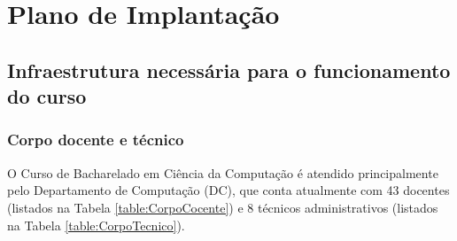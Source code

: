 
\chapter {Plano de Implantação}\label{sec:implantacao}

\section {Infraestrutura necessária para o funcionamento do curso}

\subsection{Corpo docente e técnico}

O Curso de Bacharelado em Ciência da Computação é atendido principalmente pelo Departamento de Computação (DC), que conta atualmente com 43 docentes (listados na Tabela \ref{table:CorpoCocente}) e 8 técnicos administrativos (listados na Tabela \ref{table:CorpoTecnico}). 

